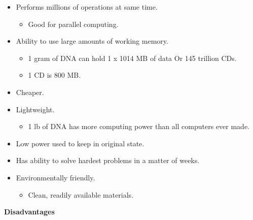 \begin{itemize}
    \item {Performs millions of operations at same time.
          \begin{itemize}
        \item{Good for parallel computing.}
      \end{itemize}
            }
        \item {Ability to use large amounts of working memory.
          \begin{itemize}
        \item{1 gram of DNA can hold 1 x 1014 MB of data Or 145 trillion CDs.}
                \item{1 CD is 800 MB.}
      \end{itemize}
            }
       
    \item {Cheaper.}
        \item {Lightweight.
          \begin{itemize}
        \item{1 lb of DNA has more computing power than all computers ever made.}
      \end{itemize}
            }
    \item { Low power used to keep in original state.}
    \item {Has ability to solve hardest problems in a matter of weeks.}
        \item {Environmentally friendly.
          \begin{itemize}
        \item{Clean, readily available materials.}
      \end{itemize}}
  \end{itemize}


  \textbf{Disadvantages}

